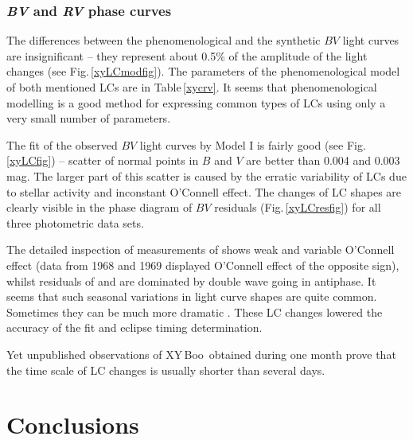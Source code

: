 \documentclass{aa}
\newcommand{\hvezda}{XY\,Boo}
\begin{document}
\subsubsection{\textit{BV} and \textit{RV} phase curves}\label{xyphasecrv}


The differences between the phenomenological and the synthetic $BV$ light curves are insignificant -- they represent about 0.5\% of the amplitude of the light changes (see Fig.\,\ref{xyLCmodfig}). The parameters of the phenomenological model of both mentioned LCs are in Table\,\ref{xycrv}. It seems that phenomenological modelling is a good method for expressing common types of LCs using only a very small number of parameters.


The fit of the observed $BV$ light curves by Model I is fairly good (see Fig.\,\ref{xyLCfig}) -- scatter of normal points in $B$ and $V$ are better than 0.004 and 0.003 mag. The larger part of this scatter is caused by the erratic variability of LCs due to stellar activity and inconstant O'Connell effect. The changes of LC shapes are clearly visible in the phase diagram of $BV$ residuals (Fig.\,\ref{xyLCresfig}) for all three photometric data sets.


The detailed inspection of measurements of \citet{bin} shows weak and variable O'Connell effect (data from 1968 and 1969 displayed O'Connell effect of the opposite sign), whilst residuals of \citet{winkler} and \citet{awa} are dominated by double wave going in antiphase. It seems that such seasonal variations in light curve shapes are quite common. Sometimes they can be much more dramatic \citep[see e.g. changes in LCs of notorious XY\,UMa,][]{lister}. These LC changes lowered the accuracy of the fit and eclipse timing determination.

Yet unpublished observations of \hvezda\ obtained during one month \citep{mikxy} prove that the time scale of LC changes is usually shorter than several days.


\section{Conclusions } \label{conclusions}

\end{document}
